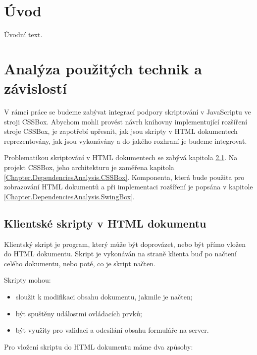 
\chapter{Úvod}
\label{Chapter.Introducion}
Úvodní text.

\chapter{Analýza použitých technik a závislostí}
\label{Chapter.DependenciesAnalysis}

V rámci práce se budeme zabývat integrací podpory skriptování v JavaScriptu ve stroji CSSBox. Abychom mohli provést návrh knihovny implementující rozšíření stroje CSSBox, je zapotřebí upřesnit, jak jsou skripty v HTML dokumentech reprezentovány, jak jsou vykonávány a do jakého rozhraní je budeme integrovat.

Problematikou skriptování v HTML dokumentech se zabývá kapitola \ref{Chapter.DependenciesAnalysis.ScriptsInHTML}. Na projekt CSSBox, jeho architekturu je zaměřena kapitola \ref{Chapter.DependenciesAnalysis.CSSBox}. Komponenta, která bude použita pro zobrazování HTML dokumentů a při implementaci rozšíření je popsána v kapitole \ref{Chapter.DependenciesAnalysis.SwingBox}. 

\section{Klientské skripty v HTML dokumentu}
\label{Chapter.DependenciesAnalysis.ScriptsInHTML}

Klientský skript je program, který může být doprovázet, nebo být přímo vložen do HTML dokumentu. Skript je vykonáván na straně klienta buď po načtení celého dokumentu, nebo poté, co je skript načten. 

\bigskip \noindent Skripty mohou:

\begin{itemize}
  \item sloužit k modifikaci obsahu dokumentu, jakmile je načten;
  \item být spuštěny událostmi ovládacích prvků;
  \item být využity pro validaci a odesílání obsahu formuláře na server.
\end{itemize}

\bigskip \noindent Pro vložení skriptu do HTML dokumentu máme dva způsoby:

